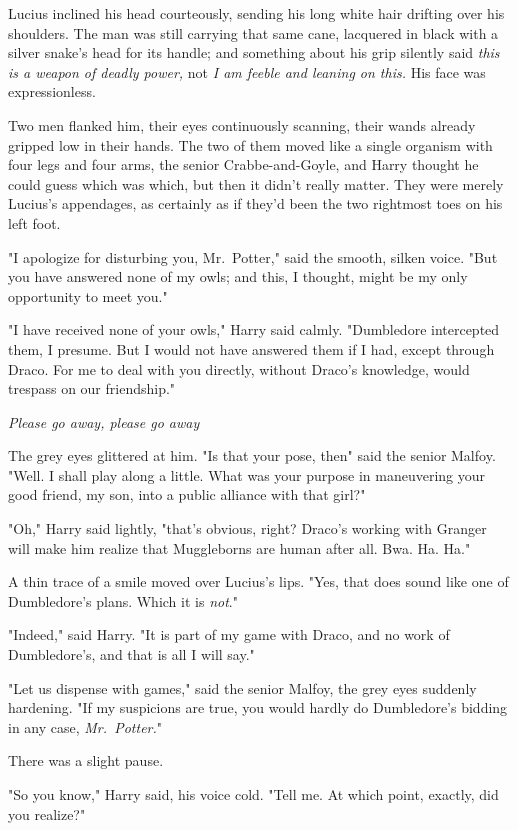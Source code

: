 Lucius inclined his head courteously, sending his long white hair drifting over
his shoulders. The man was still carrying that same cane, lacquered in black
with a silver snake's head for its handle; and something about his grip
silently said \emph{this is a weapon of deadly power,} not \emph{I am feeble
and leaning on this.} His face was expressionless.

Two men flanked him, their eyes continuously scanning, their wands already
gripped low in their hands. The two of them moved like a single organism with
four legs and four arms, the senior Crabbe-and-Goyle, and Harry thought he
could guess which was which, but then it didn't really matter. They were merely
Lucius's appendages, as certainly as if they'd been the two rightmost toes on
his left foot.

"I apologize for disturbing you, Mr.~Potter," said the smooth, silken voice.
"But you have answered none of my owls; and this, I thought, might be my only
opportunity to meet you."

"I have received none of your owls," Harry said calmly. "Dumbledore intercepted
them, I presume. But I would not have answered them if I had, except through
Draco. For me to deal with you directly, without Draco's knowledge, would
trespass on our friendship."

\emph{Please go away, please go away{\el}}

The grey eyes glittered at him. "Is that your pose, then{\el}" said the
senior Malfoy. "Well. I shall play along a little. What was your purpose in
maneuvering your good friend, my son, into a public alliance with that girl?"

"Oh," Harry said lightly, "that's obvious, right? Draco's working with Granger
will make him realize that Muggleborns are human after all. Bwa. Ha. Ha."

A thin trace of a smile moved over Lucius's lips. "Yes, that does sound like
one of Dumbledore's plans. Which it is \emph{not}."

"Indeed," said Harry. "It is part of my game with Draco, and no work of
Dumbledore's, and that is all I will say."

"Let us dispense with games," said the senior Malfoy, the grey eyes suddenly
hardening. "If my suspicions are true, you would hardly do Dumbledore's bidding
in any case, \emph{Mr.~Potter.}"

There was a slight pause.

"So you know," Harry said, his voice cold. "Tell me. At which point, exactly,
did you realize?"

